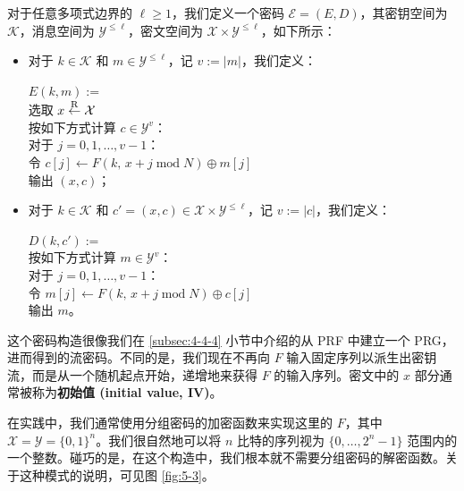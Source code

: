 对于任意多项式边界的 $\ell\geq1$，我们定义一个密码 $\mathcal{E}=(E,D)$，其密钥空间为 $\mathcal{K}$，消息空间为 $\mathcal{Y}^{\leq\ell}$，密文空间为 $\mathcal{X}\times\mathcal{Y}^{\leq\ell}$，如下所示：
\begin{itemize}
	\item 对于 $k\in\mathcal{K}$ 和 $m\in\mathcal{Y}^{\leq\ell}$，记 $v:=|m|$，我们定义：
	
	\hspace*{20pt} $E(k,m):=$\\
	\hspace*{50pt} 选取 $x\overset{\rm R}\leftarrow\mathcal{X}$\\
	\hspace*{50pt} 按如下方式计算 $c\in\mathcal{Y}^v$：\\
	\hspace*{75pt} 对于 $j=0,1,\dots,v-1$：\\
	\hspace*{100pt} 令 $c[j]\leftarrow F(k,\,x+j\;\mathrm{mod}\;N)\oplus m[j]$\\
	\hspace*{50pt} 输出 $(x,c)$；
	\item 对于 $k\in\mathcal{K}$ 和 $c'=(x,c)\in\mathcal{X}\times\mathcal{Y}^{\leq\ell}$，记 $v:=|c|$，我们定义：
	
	\hspace*{20pt} $D(k,c'):=$\\
	\hspace*{50pt} 按如下方式计算 $m\in\mathcal{Y}^v$：\\
	\hspace*{75pt} 对于 $j=0,1,\dots,v-1$：\\
	\hspace*{100pt} 令 $m[j]\leftarrow F(k,\,x+j\;\mathrm{mod}\;N)\oplus c[j]$\\
	\hspace*{50pt} 输出 $m$。
\end{itemize}

这个密码构造很像我们在 \ref{subsec:4-4-4} 小节中介绍的从 PRF 中建立一个 PRG，进而得到的流密码。不同的是，我们现在不再向 $F$ 输入固定序列以派生出密钥流，而是从一个随机起点开始，递增地来获得 $F$ 的输入序列。密文中的 $x$ 部分通常被称为\textbf{初始值 (initial value, IV)}。

在实践中，我们通常使用分组密码的加密函数来实现这里的 $F$，其中 $\mathcal{X}=\mathcal{Y}=\{0,1\}^n$。我们很自然地可以将 $n$ 比特的序列视为 $\{0,\dots,2^n-1\}$ 范围内的一个整数。碰巧的是，在这个构造中，我们根本就不需要分组密码的解密函数。关于这种模式的说明，可见图 \ref{fig:5-3}。

